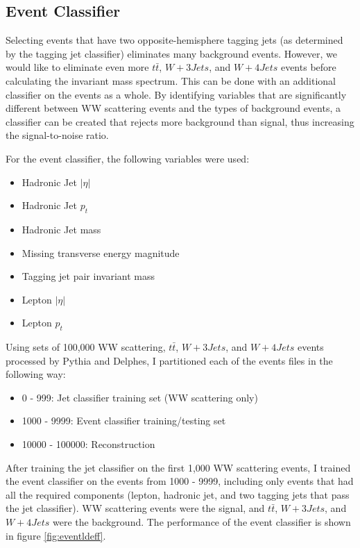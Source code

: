 \documentclass[10pt]{ucscthesisbs}
\begin{document}
\subsection{Event Classifier}
Selecting events that have two opposite-hemisphere tagging jets (as determined by the tagging jet classifier) eliminates many background events. However, we would like to eliminate even more $t\bar{t}$, $W+3Jets$, and $W+4Jets$ events before calculating the invariant mass spectrum. This can be done with an additional classifier on the events as a whole. By identifying variables that are significantly different between WW scattering events and the types of background events, a classifier can be created that rejects more background than signal, thus increasing the signal-to-noise ratio. \par
For the event classifier, the following variables were used:
\begin{itemize}
\item Hadronic Jet $|\eta|$
\item Hadronic Jet $p_t$
\item Hadronic Jet mass
\item Missing transverse energy magnitude
\item Tagging jet pair invariant mass
\item Lepton $|\eta|$
\item Lepton $p_t$
\end{itemize}
Using sets of 100,000 WW scattering, $t\bar{t}$, $W+3Jets$, and $W+4Jets$ events processed by Pythia and Delphes, I partitioned each of the events files in the following way:
\begin{itemize}
\item 0 - 999: Jet classifier training set (WW scattering only)
\item 1000 - 9999: Event classifier training/testing set
\item 10000 - 100000: Reconstruction
\end{itemize}
After training the jet classifier on the first 1,000 WW scattering events, I trained the event classifier on the events from 1000 - 9999, including only events that had all the required components (lepton, hadronic jet, and two tagging jets that pass the jet classifier). WW scattering events were the signal, and $t\bar{t}$, $W+3Jets$, and $W+4Jets$ were the background. The performance of the event classifier is shown in figure \ref{fig:eventldeff}.
\end{document}
